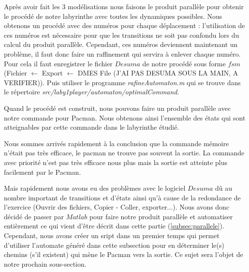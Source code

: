 % 



Après avoir fait les 3 modélisations nous faisons le produit parallèle pour obtenir le procédé de notre labyrinthe avec toutes les dynamiques possibles. Nous obtenons un procédé avec des numéros pour chaque déplacement : l'utilisation de ces numéros est nécessaire pour que les transitions ne soit pas confondu lors du calcul du produit parallèle. Cependant, ces numéros deviennent maintenant un problème, il faut donc faire un raffinement qui servira à enlever chaque numéro. Pour cela il faut enregistrer le fichier $Desuma$ de notre procédé sous forme $fsm$ (Fichier $\leftarrow $ Export $\leftarrow $ DMES File (J'AI PAS DESUMA SOUS LA MAIN, A VERIFIER)). Puis utiliser le programme \emph{rafineAutomaton.m} qui se trouve dans le répertoire \emph{src/laby1player/automaton/optimalCommand}.


Quand le procédé est construit, nous pouvons faire un produit parallèle avec notre commande pour Pacman. Nous obtenons ainsi l'ensemble des états qui sont atteignables par cette commande dans le labyrinthe étudié.


Nous sommes arrivés rapidement à la conclusion que la commande mémoire n'était pas très efficace, le pacman ne trouve pas souvent la sortie. La commande avec priorité n'est pas très efficace nous plus mais la sortie est atteinte plus facilement par le Pacman.


Mais rapidement nous avons eu des problèmes avec le logiciel $Desuma$ dû au nombre important de transitions et d'états ainsi qu'à cause de la redondance de l'exercice (Ouvrir des fichiers, Copier - Coller, exporter...). Nous avons donc décidé de passer par $Matlab$ pour faire notre produit parallèle et automatiser entièrement ce qui vient d'être décrit dans cette partie (\ref{subsec:parallele}). Cependant, nous avons créer un sript dans un premier temps qui permet d'utiliser l'automate généré dans cette subsection pour en déterminer le(s) chemins (s'il existent) qui mène le Pacman vers la sortie. %
Ce sujet sera l'objet  de notre prochain sous-section.
